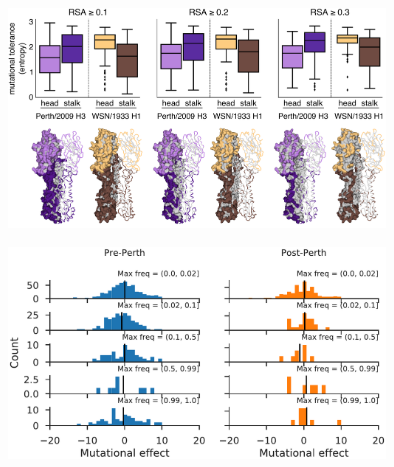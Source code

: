 \documentclass[9pt,twocolumn,twoside]{pnas-new}
\begin{document}
\begin{suppfigure}[H]
\centerline{\includegraphics[width=0.75\textwidth]{figs/supp_head_stalk_RSA/head_stalk_RSA.pdf}}
\caption{\label{suppfig:head_stalk_RSA}
{\bf Mutational tolerances of the head and stalk domains at various relative solvent accessibility cutoffs.}
The mutational tolerances of the head and stalk domains show less disparity for the Perth/2009 H3 HA compared to those for the WSN/1933 H1 HA.
We used relative solvent accessibility (RSA) cutoffs of $0.1$, $0.2$, and $0.3$ to define solvent-exposed residues and plotted the mutational tolerances (Shannon entropy of re-scaled preferences) of these residues in the head and stalk domains for the Perth/2009 H3 HA (purple) and the WSN/1933 H1 HA (brown).
Residues falling in between the two cysteines at sites 52 and 277 were defined as belonging to the head domain, while all other residues were defined as the stalk domain.
The HA structures color the residues that are defined as solvent exposed at a given RSA cutoff.
One monomer is shown in surface representation and another monomer shown in ribbon representation.
Residues in lighter shades of purple or brown are in the head domain, while residues in darker shades are in the stalk domain.
Note that the mutational tolerance values are not comparable between the two HAs.
}
\end{suppfigure}

\begin{suppfigure}[H]
\centerline{\includegraphics[width=0.75\textwidth]{figs/muteffect_by_maxfreq_WSN_2.pdf}}
\caption{\label{suppfig:muteffect_maxfreq_WSN_supp}
{\bf The distribution of mutational effects measured in H1 HA among H3N2 mutations binned by the maximum frequency that they reach.}
This figure repeats the analysis of the H3N2 mutation frequencies in Figure~\ref{fig:muteffect_maxfreq}B, but uses the deep mutational scanning data for an H1 HA as measured in \cite{doud2016accurate}.
}
\end{suppfigure}
\end{document}
